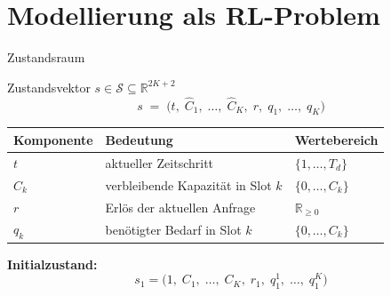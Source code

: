 \documentclass[aspectratio=169]{beamer}
\begin{document}
\section{Modellierung als RL-Problem}

\begin{frame}{Zustandsraum}

  \begin{block}{Zustandsvektor $s \in \mathcal{S} \subseteq \mathbb{R}^{2K+2}$}
    \[
      s \;=\; \bigl(t,\;\hat{C}_1,\;\ldots,\;\hat{C}_K,\;r,\;q_1,\;\ldots,\;q_K\bigr)
    \]
  \end{block}

  \bigskip
  \begin{tabular}{lll}
    \hline
    \textbf{Komponente} & \textbf{Bedeutung} & \textbf{Wertebereich} \\
    \hline
    $t$ & aktueller Zeitschritt & $\{1, \ldots, T_d\}$ \\
    $\hat{C}_k$ & verbleibende Kapazität in Slot $k$ & $\{0, \ldots, C_k\}$ \\
    $r$ & Erlös der aktuellen Anfrage & $\mathbb{R}_{\geq 0}$ \\
    $q_k$ & benötigter Bedarf in Slot $k$ & $\{0, \ldots, C_k\}$ \\
    \hline
  \end{tabular}

  \bigskip
  \textbf{Initialzustand:}
  \[
    s_1 = \bigl(1,\;C_1,\;\ldots,\;C_K,\;r_1,\;q_1^1,\;\ldots,\;q_1^K\bigr)
  \]

\end{frame}
\end{document}
